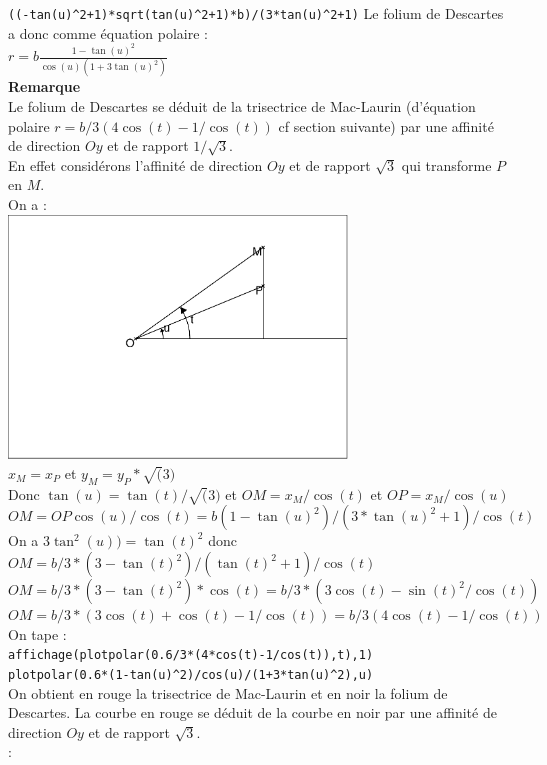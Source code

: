 \documentclass[a4paper,11pt]{book}
\begin{document}
{\tt ((-tan(u)\verb|^|2+1)*sqrt(tan(u)\verb|^|2+1)*b)/(3*tan(u)\verb|^|2+1)}
Le folium de Descartes a donc comme \'equation polaire :\\
$r=b\frac{1-\tan(u)^2}{\cos(u)(1+3\tan(u)^2)}$\\ 
{\bf Remarque} \\
Le folium de Descartes se d\'eduit de la trisectrice de Mac-Laurin (d'\'equation
polaire $r=b/3(4\cos(t)-1/\cos(t))$ cf section suivante)
par une affinit\'e de direction $Oy$ et de rapport $1/\sqrt 3$.\\
En effet consid\'erons l'affinit\'e  de direction $Oy$ et de rapport 
$\sqrt 3$  qui transforme $P$ en $M$.\\
On a :\\
 \includegraphics[width=9cm]{foliumd1}\\
$x_M=x_P$ et $y_M=y_P*\sqrt(3)$\\
Donc
$\tan(u)=\tan(t)/\sqrt(3)$ et $OM=x_M/\cos(t)$ et $OP=x_M/\cos(u)$
$OM=OP\cos(u)/\cos(t)=b(1-\tan(u)^2)/(3*\tan(u)^2+1)/\cos(t)$
On a  $3\tan^2(u))=\tan(t)^2$ donc\\
$OM=b/3*(3-\tan(t)^2)/(\tan(t)^2+1)/\cos(t)$\\
$OM=b/3*(3-\tan(t)^2)*\cos(t)=b/3*(3\cos(t)-\sin(t)^2/\cos(t))$\\
$OM=b/3*(3\cos(t)+\cos(t)-1/\cos(t))=b/3(4\cos(t)-1/\cos(t))$\\
On tape :\\
{\tt affichage(plotpolar(0.6/3*(4*cos(t)-1/cos(t)),t),1)}\\
{\tt plotpolar(0.6*(1-tan(u)\verb|^|2)/cos(u)/(1+3*tan(u)\verb|^|2),u)}\\
On obtient en rouge la trisectrice de Mac-Laurin et en noir la folium de 
Descartes. La courbe en rouge se d\'eduit de la courbe en noir par une 
affinit\'e de direction $Oy$ et de rapport $\sqrt 3$.\\:\\
\end{document}
